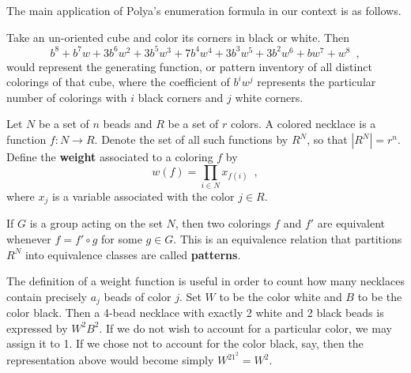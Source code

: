 The main application of Polya's enumeration formula in our context is as follows.

\begin{example} \cite{Tucker1974} Take an un-oriented cube and color its corners in black or white. Then
$$
b^8 + b^7w + 3b^6w^2 + 3b^5w^3 + 7b^4w^4 + 3b^3w^5 + 3b^2w^6 + bw^7 + w^8 \enspace,
$$
would represent the generating function, or pattern inventory of all distinct colorings of that cube, where the coefficient of $b^iw^j$ represents the particular number of colorings with $i$ black corners and $j$ white corners.
\end{example}

\begin{definition} Let $N$ be a set of $n$ beads and $R$ be a set of $r$ colors. A colored necklace is a function $f : N \to R$. Denote the set of all such functions by $R^N$, so that $|R^N| = r^n$. Define the \textbf{weight} associated to a coloring $f$ by
$$
w(f) = \prod_{i \in N} x_{f(i)} \enspace,
$$
where $x_j$ is a variable associated with the color $j \in R$.
\end{definition}

If $G$ is a group acting on the set $N$, then two colorings $f$ and $f'$ are equivalent whenever $f = f' \circ g$ for some $g \in G$. This is an equivalence relation that partitions $R^N$ into equivalence classes are called \textbf{patterns}.

\begin{example} The definition of a weight function is useful in order to count how many necklaces contain precisely $a_j$ beads of color $j$. Set $W$ to be the color white and $B$ to be the color black. Then a 4-bead necklace with exactly 2 white and 2 black beads is expressed by $W^2B^2$. If we do not wish to account for a particular color, we may assign it to 1. If we chose not to account for the color black, say, then the representation above would become simply $W^21^2 = W^2$.
\end{example}

